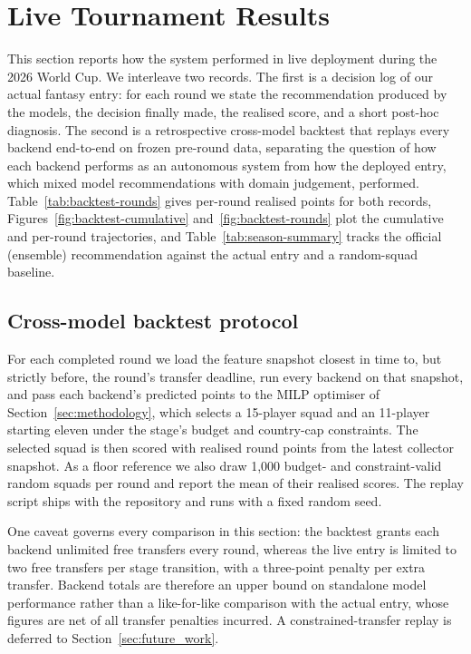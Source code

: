 \section{Live Tournament Results}
\label{sec:live-results}

This section reports how the system performed in live deployment
during the 2026 World Cup. We interleave two records. The first is a
decision log of our actual fantasy entry: for each round we state the
recommendation produced by the models, the decision finally made, the
realised score, and a short post-hoc diagnosis. The second is a
retrospective cross-model backtest that replays every backend
end-to-end on frozen pre-round data, separating the question of how
each backend performs as an autonomous system from how the deployed
entry, which mixed model recommendations with domain judgement,
performed. Table~\ref{tab:backtest-rounds} gives per-round realised
points for both records, Figures~\ref{fig:backtest-cumulative}
and~\ref{fig:backtest-rounds} plot the cumulative and per-round
trajectories, and Table~\ref{tab:season-summary} tracks the official
(ensemble) recommendation against the actual entry and a random-squad
baseline.

\subsection{Cross-model backtest protocol}
\label{sec:live-protocol}

For each completed round we load the feature snapshot closest in
time to, but strictly before, the round's transfer deadline, run
every backend on that snapshot, and pass each backend's predicted
points to the MILP optimiser of Section~\ref{sec:methodology}, which
selects a 15-player squad and an 11-player starting eleven under the
stage's budget and country-cap constraints. The selected squad is
then scored with realised round points from the latest collector
snapshot. As a floor reference we also draw 1{,}000 budget- and
constraint-valid random squads per round and report the mean of
their realised scores. The replay script ships with the repository
and runs with a fixed random seed.

One caveat governs every comparison in this section: the backtest
grants each backend unlimited free transfers every round, whereas
the live entry is limited to two free transfers per stage
transition, with a three-point penalty per extra transfer. Backend
totals are therefore an upper bound on standalone model performance
rather than a like-for-like comparison with the actual entry, whose
figures are net of all transfer penalties incurred. A
constrained-transfer replay is deferred to
Section~\ref{sec:future_work}.

